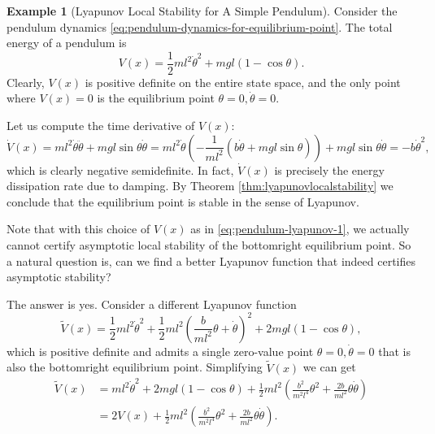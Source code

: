 \documentclass[
]{book}
\theoremstyle{definition}
\theoremstyle{definition}
\newtheorem{example}{Example}[chapter]
\theoremstyle{definition}
\theoremstyle{definition}
\theoremstyle{remark}
\begin{document}
\begin{example}[Lyapunov Local Stability for A Simple Pendulum]
\protect\hypertarget{exm:lyapunovlocalstabilitypendulum}{}\label{exm:lyapunovlocalstabilitypendulum}Consider the pendulum dynamics \eqref{eq:pendulum-dynamics-for-equilibrium-point}. The total energy of a pendulum is
\begin{equation}
V(x) = \frac{1}{2} ml^2 \dot{\theta}^2 + mgl (1 - \cos \theta).
\label{eq:pendulum-lyapunov-1}
\end{equation}
Clearly, \(V(x)\) is positive definite on the entire state space, and the only point where \(V(x) = 0\) is the equilibrium point \(\theta = 0, \dot{\theta} = 0\).

Let us compute the time derivative of \(V(x)\):
\[
\dot{V}(x) = ml^2 \dot{\theta} \ddot{\theta} + mgl \sin \theta \dot{\theta} = ml^2 \dot{\theta} \left( -\frac{1}{ml^2}(b \dot{\theta} + mgl \sin\theta)  \right) + mgl \sin \theta \dot{\theta} = -b \dot{\theta}^2 ,
\]
which is clearly negative semidefinite. In fact, \(\dot{V}(x)\) is precisely the energy dissipation rate due to damping. By Theorem \ref{thm:lyapunovlocalstability} we conclude that the equilibrium point is stable in the sense of Lyapunov.

Note that with this choice of \(V(x)\) as in \eqref{eq:pendulum-lyapunov-1}, we actually cannot certify asymptotic local stability of the bottomright equilibrium point. So a natural question is, can we find a better Lyapunov function that indeed certifies asymptotic stability?

The answer is yes. Consider a different Lyapunov function
\begin{equation}
\tilde{V}(x) = \frac{1}{2} ml^2 \dot{\theta}^2 + \frac{1}{2} ml^2 \left( \frac{b}{ml^2}\theta + \dot{\theta} \right)^2 + 2mgl (1 - \cos \theta),
\label{eq:pendulum-lyapunov-2}
\end{equation}
which is positive definite and admits a single zero-value point \(\theta = 0, \dot{\theta} = 0\) that is also the bottomright equilibrium point. Simplifying \(\tilde{V}(x)\) we can get
\begin{align}
\tilde{V}(x) &= ml^2 \dot{\theta}^2 + 2mgl(1-\cos \theta) + \frac{1}{2} ml^2 \left( \frac{b^2}{m^2 l^4} \theta^2 + \frac{2b}{ml^2} \theta \dot{\theta} \right) \\
&= 2V(x) + \frac{1}{2} ml^2 \left( \frac{b^2}{m^2 l^4} \theta^2 + \frac{2b}{ml^2} \theta \dot{\theta} \right).
\end{align}


\end{example}
\end{document}
